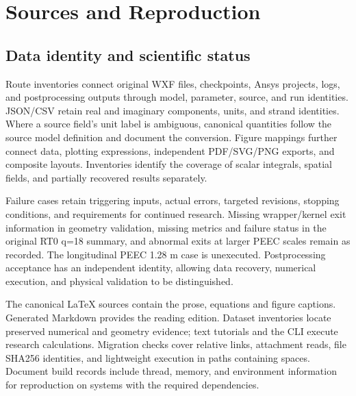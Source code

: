 \section{Sources and Reproduction}
\label{chapter:S3}

\hypertarget{S3.report_repro.heading}{}
\subsection{Data identity and scientific status}

\hypertarget{S3.report_repro.p1}{}
Route inventories connect original WXF files, checkpoints, Ansys projects, logs, and postprocessing outputs through model, parameter, source, and run identities. JSON/CSV retain real and imaginary components, units, and strand identities. Where a source field's unit label is ambiguous, canonical quantities follow the source model definition and document the conversion. Figure mappings further connect data, plotting expressions, independent PDF/SVG/PNG exports, and composite layouts. Inventories identify the coverage of scalar integrals, spatial fields, and partially recovered results separately.

\hypertarget{S3.report_repro.p2}{}
Failure cases retain triggering inputs, actual errors, targeted revisions, stopping conditions, and requirements for continued research. Missing wrapper/kernel exit information in geometry validation, missing metrics and failure status in the original RT0 q=18 summary, and abnormal exits at larger PEEC scales remain as recorded. The longitudinal PEEC 1.28 m case is unexecuted. Postprocessing acceptance has an independent identity, allowing data recovery, numerical execution, and physical validation to be distinguished.

\hypertarget{S3.report_repro.p3}{}
The canonical LaTeX sources contain the prose, equations and figure captions. Generated Markdown provides the reading edition. Dataset inventories locate preserved numerical and geometry evidence; text tutorials and the CLI execute research calculations. Migration checks cover relative links, attachment reads, file SHA256 identities, and lightweight execution in paths containing spaces. Document build records include thread, memory, and environment information for reproduction on systems with the required dependencies.

\hypertarget{S3.workflow.heading}{}
